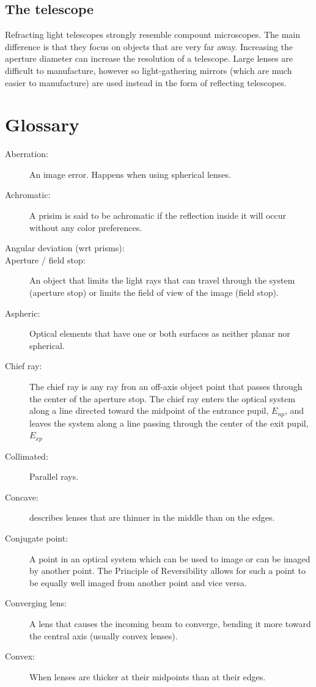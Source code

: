 \documentclass[12pt]{report}
\begin{document}
\subsection{The telescope}
Refracting light telescopes strongly resemble compount microscopes. The main difference is that they focus on objects that are very far away. Increasing the aperture diameter can increase the resolution of a telescope. Large lenses are difficult to manufacture, however so light-gathering mirrors (which are much easier to manufacture) are used instead in the form of reflecting telescopes. 


\section{Glossary}
\begin{description}
\item[Aberration: ] An image error. Happens when using spherical lenses.
\item[Achromatic: ] A prisim is said to be achromatic if the reflection inside it will occur without any color preferences. 
\item[Angular deviation (wrt prisms): ]
\item[Aperture / field stop: ] An object that limits the light rays that can travel through the system (aperture stop) or limits the field of view of the image (field stop). 
\item[Aspheric: ] Optical elements that have one or both surfaces as neither planar nor spherical. 
\item[Chief ray: ] The chief ray is any ray fron an off-axis object point that passes through the center of the aperture stop. The chief ray enters the optical system along a line directed toward the midpoint of the entrance pupil, $E_{np}$, and leaves the system along a line passing through the center of the exit pupil, $E_{xp}$
\item[Collimated: ] Parallel rays.
\item[Concave: ] describes lenses that are thinner in the middle than on the edges. 
\item[Conjugate point: ] A point in an optical system which can be used to image or can be imaged by another point. The Principle of Reversibility allows for such a point to be equally well imaged from another point and vice versa. 
\item[Converging lens: ] A lens that causes the incoming beam to converge, bending it more toward the central axis (usually convex lenses).
\item[Convex: ] When lenses are thicker at their midpoints than at their edges. 

\end{description}
\end{document}
